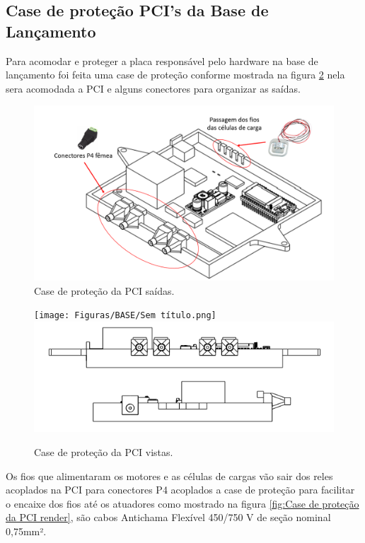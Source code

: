 \subsection{Case de proteção PCI's da Base de Lançamento}
\par Para acomodar e proteger a placa responsável pelo hardware na base de lançamento foi feita uma case de proteção conforme mostrada na figura \ref{fig:Case de proteção da PCI vistas} nela sera acomodada a PCI e alguns conectores para organizar as saídas.
\begin{figure}[H]
  \centering
  \includegraphics[scale=0.4]{Figuras/BASE/case f.png}

  \caption{Case de proteção da PCI saídas.}
  \label{fig:Case de proteção da PCI saídas}
\end{figure}
\begin{figure}[H]
  \centering
  \texttt{[image: Figuras/BASE/Sem título.png]}
    \includegraphics[scale=0.7]{Figuras/BASE/case.png}
  \caption{Case de proteção da PCI vistas.}
  \label{fig:Case de proteção da PCI vistas}
\end{figure}
\PAR Os fios que alimentaram os motores e as células de cargas vão sair dos reles acoplados na PCI para conectores P4 acoplados a case de proteção para facilitar o encaixe dos fios até os atuadores como mostrado na figura \ref{fig:Case de proteção da PCI render}, são cabos Antichama Flexível 450/750 V de seção nominal 0,75mm².

